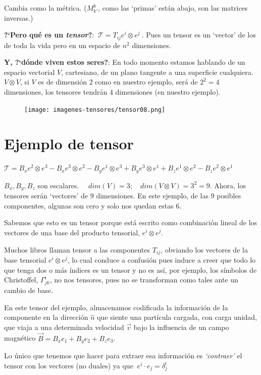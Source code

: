 \textcolor{gris}{Cambia como la métrica.}
\textcolor{gris}{($M_{k'}^k$, como las `primas' están abajo, son las matrices inversas.)}

\textbf{?`Pero qué es un \emph{tensor}?}: $\ \mathcal T=T_{ij}e^i \otimes e^j\ $. Pues un tensor es un `vector' de los de toda la vida pero en un espacio de $n^2$ dimensiones.

\textbf{Y, ?`dónde viven estos seres?}: En todo momento estamos hablando de un espacio vectorial $V$, cartesiano, de un plano tangente a una superficie cualquiera. $V\otimes V$, si $V$ es de dimensión $2$ como en nuestro ejemplo, será de $2^2=4$ dimensiones, los tensores tendrán 4 dimensiones (en nuestro ejemplo).

\begin{figure}[H]
		\centering
		\texttt{[image: imagenes-tensores/tensor08.png]}
	\end{figure}

\section{Ejemplo de tensor} 

$\mathcal T=B_x e^2\otimes e^3-B_xe^3\otimes e^2-B_ye^1\otimes e^3+B_ye^3\otimes e^1+B_ze^1\otimes e^2-B_ze^2\otimes e^1$

$B_x,B_y,B_z$ son escalares. $\quad dim(V)=3;\quad dim(V\otimes V)=3^2=9$. Ahora, los tensores  serán `vectores' de $9$ dimensiones. En este ejemplo, de las $9$ posibles componentes, algunas son cero y solo nos quedan estas $6$.

Sabemos que esto es un tensor porque está escrito como combinación lineal de los vectores de una base del producto tensorial, $e^i\otimes e^j$.

\textcolor{gris}{Muchos libros llaman tensor a las componentes $T_{ij}$, obviando los vectores de la base tensorial $e^i\otimes e^j$, lo cual conduce a confusión pues induce a creer que todo lo que tenga dos o más índices es un tensor y no es así, por ejemplo, los símbolos de Christoffel, $\Gamma^i_{jk}$, no nos tensores, pues no se transforman como tales ante un cambio de base.}

En este tensor del ejemplo, almacenamos codificada la información de la componente en la dirección $\hat n$ que siente una partícula cargada, con carga unidad, que viaja a una determinada velocidad $\vec v$ bajo la influencia de un campo magnético $\overrightarrow B=B_xe_1+B_ye_2+B_ze_3$.

Lo único que tenemos que hacer para extraer esa información es \emph{`contraer'} el tensor con los vectores (no duales) ya que $\ e^i \cdot e_j=\delta^i_j$

